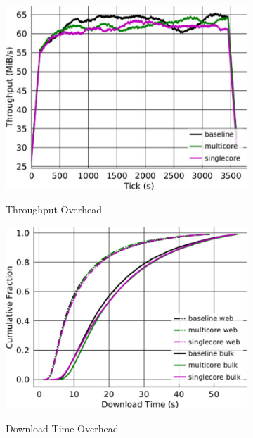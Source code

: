 \begin{figure} \centering
	\begin{subfigure}[t]{0.32\textwidth} \centering
\includegraphics[trim={0 3cm 0 3cm}, clip, width=1.0\textwidth]{images/overhead_throughput.pdf}
		\label{fig:stats_a}
		\caption{Throughput Overhead}
	\end{subfigure}
	\begin{subfigure}[t]{0.32\textwidth} \centering
\includegraphics[trim={0 3cm 0 3cm}, clip, width=1.0\textwidth]{images/overhead_downloadtime.pdf}
		\label{fig:stats_b}
		\caption{Download Time Overhead}
	\end{subfigure}
	\begin{subfigure}[t]{0.32\textwidth} \centering

\end{subfigure}
\end{figure}
